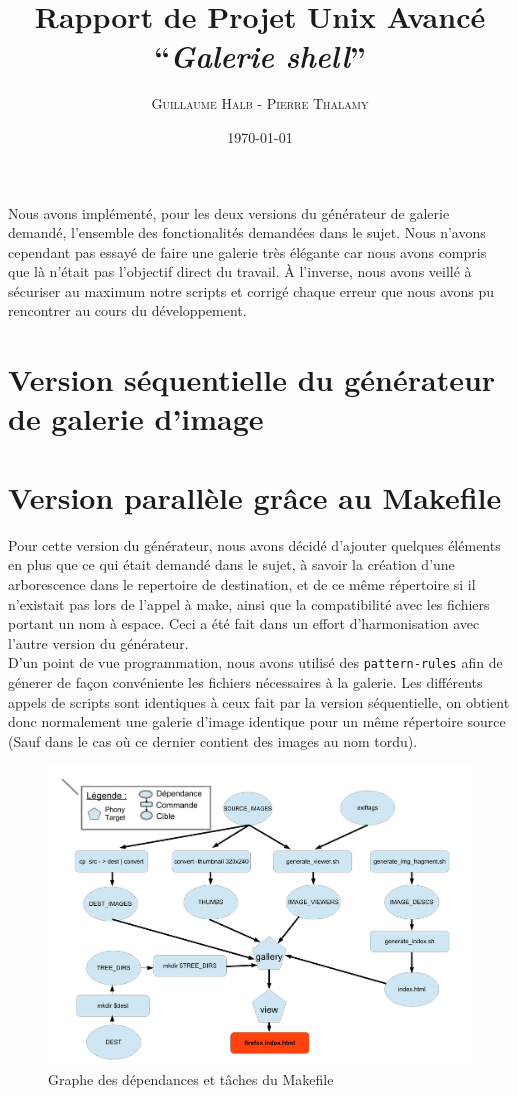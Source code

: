 \documentclass[10.9pt]{article}
\title{Rapport de Projet Unix Avancé\\
  ``{\em Galerie shell}'' }
\author{\textsc{Guillaume Halb} - \textsc{Pierre Thalamy}}
\date{\today}
\begin{document}
\maketitle

Nous avons implémenté, pour les deux versions du générateur
de galerie demandé, l'ensemble des fonctionalités demandées dans le
sujet. Nous n'avons cependant pas essayé de faire une galerie très élégante car
nous avons compris que là n'était pas l'objectif direct du travail. À
l'inverse, nous avons veillé à sécuriser au maximum notre scripts et
corrigé chaque erreur que nous avons pu rencontrer au cours du
développement.

\section{Version séquentielle du générateur de galerie d'image}

\section{Version parallèle grâce au Makefile}
Pour cette version du générateur, nous avons décidé d'ajouter quelques
éléments en plus que ce qui était demandé dans le sujet, à savoir la
création d'une arborescence dans le repertoire de destination, et de
ce même répertoire si il n'existait pas lors de l'appel à
make, ainsi que la compatibilité avec les fichiers portant un nom à
espace. Ceci a été fait dans un effort d'harmonisation avec l'autre
version du générateur. \\  

D'un point de vue programmation, nous avons utilisé des
\lstinline!pattern-rules! afin de génerer de façon convéniente les
fichiers nécessaires à la galerie. Les différents appels de scripts
sont identiques à ceux fait par la version séquentielle, on obtient
donc normalement une galerie d'image identique pour un même répertoire
source (Sauf dans le cas où ce dernier contient des images au nom
tordu). \\

\begin{figure}[!h]
\begin{center}
  \includegraphics[width=10 cm]{makefile_graph.pdf}
  \caption{Graphe des dépendances et tâches du Makefile}
\end{center}
\label{fig:makefile_graph}
\end{figure}
\end{document}
